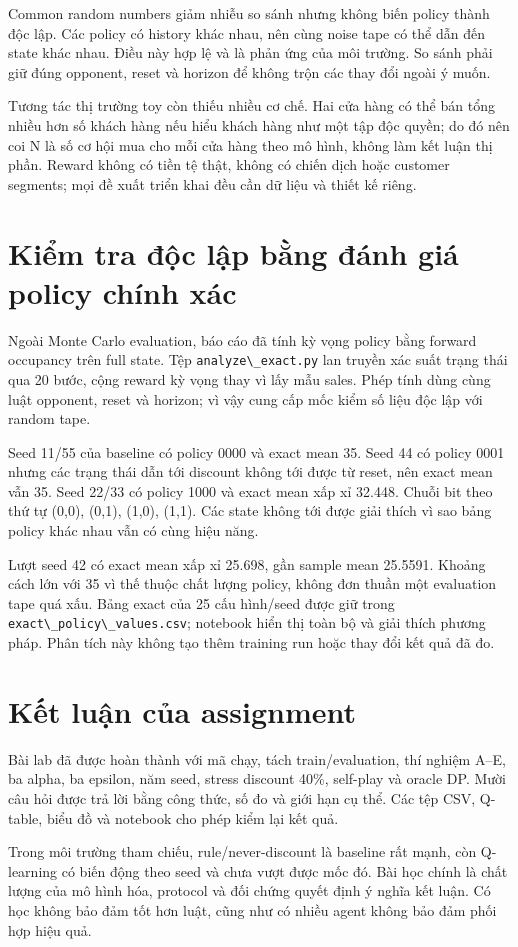 Common random numbers giảm nhiễu so sánh nhưng không biến policy thành
độc lập. Các policy có history khác nhau, nên cùng noise tape có thể dẫn
đến state khác nhau. Điều này hợp lệ và là phản ứng của môi trường. So
sánh phải giữ đúng opponent, reset và horizon để không trộn các thay đổi
ngoài ý muốn.

Tương tác thị trường toy còn thiếu nhiều cơ chế. Hai cửa hàng có thể bán
tổng nhiều hơn số khách hàng nếu hiểu khách hàng như một tập độc quyền;
do đó nên coi N là số cơ hội mua cho mỗi cửa hàng theo mô hình, không
làm kết luận thị phần. Reward không có tiền tệ thật, không có chiến dịch
hoặc customer segments; mọi đề xuất triển khai đều cần dữ liệu và thiết
kế riêng.

\section{Kiểm tra độc lập bằng đánh giá policy chính
xác}\label{kiux1ec3m-tra-ux111ux1ed9c-lux1eadp-bux1eb1ng-ux111uxe1nh-giuxe1-policy-chuxednh-xuxe1c}

Ngoài Monte Carlo evaluation, báo cáo đã tính kỳ vọng policy bằng
forward occupancy trên full state. Tệp
\passthrough{\lstinline!analyze\_exact.py!} lan truyền xác suất trạng
thái qua 20 bước, cộng reward kỳ vọng thay vì lấy mẫu sales. Phép tính
dùng cùng luật opponent, reset và horizon; vì vậy cung cấp mốc kiểm số
liệu độc lập với random tape.

Seed 11/55 của baseline có policy 0000 và exact mean 35. Seed 44 có
policy 0001 nhưng các trạng thái dẫn tới discount không tới được từ
reset, nên exact mean vẫn 35. Seed 22/33 có policy 1000 và exact mean
xấp xỉ 32.448. Chuỗi bit theo thứ tự (0,0), (0,1), (1,0), (1,1). Các
state không tới được giải thích vì sao bảng policy khác nhau vẫn có cùng
hiệu năng.

Lượt seed 42 có exact mean xấp xỉ 25.698, gần sample mean 25.5591.
Khoảng cách lớn với 35 vì thế thuộc chất lượng policy, không đơn thuần
một evaluation tape quá xấu. Bảng exact của 25 cấu hình/seed được giữ
trong \passthrough{\lstinline!exact\_policy\_values.csv!}; notebook hiển
thị toàn bộ và giải thích phương pháp. Phân tích này không tạo thêm
training run hoặc thay đổi kết quả đã đo.

\section{Kết luận của
assignment}\label{kux1ebft-luux1eadn-cux1ee7a-assignment}

Bài lab đã được hoàn thành với mã chạy, tách train/evaluation, thí
nghiệm A--E, ba alpha, ba epsilon, năm seed, stress discount 40\%,
self-play và oracle DP. Mười câu hỏi được trả lời bằng công thức, số đo
và giới hạn cụ thể. Các tệp CSV, Q-table, biểu đồ và notebook cho phép
kiểm lại kết quả.

Trong môi trường tham chiếu, rule/never-discount là baseline rất mạnh,
còn Q-learning có biến động theo seed và chưa vượt được mốc đó. Bài học
chính là chất lượng của mô hình hóa, protocol và đối chứng quyết định ý
nghĩa kết luận. Có học không bảo đảm tốt hơn luật, cũng như có nhiều
agent không bảo đảm phối hợp hiệu quả.
